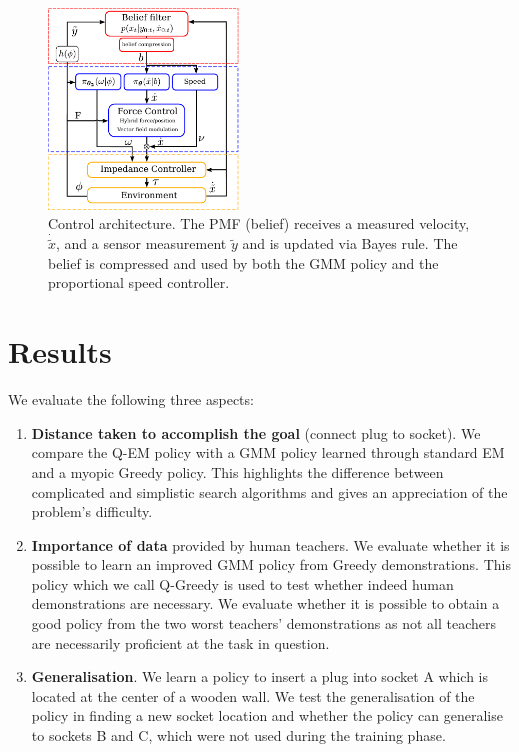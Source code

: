 \documentclass[final,5p,times,twocolumn]{elsarticle}
\begin{document}
\begin{figure}
  \centering
  \includegraphics[width=0.45\textwidth]{./Figures/control_flow_final.pdf}
  \caption{Control architecture. The PMF (belief) receives a measured velocity, $\dot{\tilde{x}}$, and 
  a sensor measurement $\tilde{y}$ and is updated via Bayes rule. The belief is compressed and used by 
  both the GMM policy and the proportional speed controller.}
  \label{fig:control_flow}
\end{figure}


\section{Results}\label{sec:results}

We evaluate the following three aspects:
\begin{enumerate}
 \item \textbf{Distance taken to accomplish the goal} (connect plug to socket). We compare the Q-EM policy with 
 a GMM policy learned through standard EM and a myopic Greedy policy. This highlights the difference between complicated and simplistic  
  search algorithms and gives an appreciation of the problem's difficulty.
 \item \textbf{Importance of data} provided by human teachers. We evaluate whether it is possible to learn 
 an improved GMM policy from Greedy demonstrations. This policy which we call Q-Greedy is used to test whether 
 indeed human demonstrations are necessary. We evaluate whether it is possible to obtain a good policy from the two worst teachers' demonstrations as not all teachers 
 are necessarily proficient at the task in question. 
  \item \textbf{Generalisation}. We learn a policy to insert a plug into socket A which is located at the center of a wooden 
 wall. We test the generalisation of the policy in finding a new socket location and whether the policy can generalise to sockets 
 B and C, which were not used during the training phase.
\end{enumerate}
\end{document}
